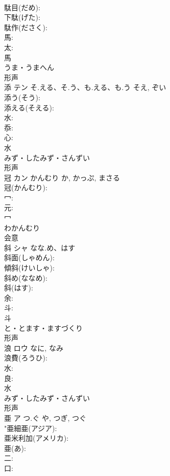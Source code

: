 \documentclass[8pt]{extreport}
\begin{document}
\begin{CJK}{UTF8}{min}
\\	駄目(だめ): 
\\	下駄(げた): 
\\	駄作(ださく): 
\\	馬: 
\\	太: 
\\	馬	
\\	うま・うまへん	
\\	形声 
\\	添	テン	そ.える、そ.う、も.える、も.う	そえ, ぞい	
\\	添う(そう): 
\\	添える(そえる): 
\\	水: 
\\	忝: 
\\	心: 
\\	水	
\\	みず・したみず・さんずい	
\\	形声 
\\	冠	カン	かんむり	か, かっぷ, まさる	
\\	冠(かんむり): 
\\	冖: 
\\	元: 
\\	冖	
\\	わかんむり	
\\	会意 
\\	斜	シャ	なな.め、はす		
\\	斜面(しゃめん): 
\\	傾斜(けいしゃ): 
\\	斜め(ななめ): 
\\	斜(はす): 
\\	余: 
\\	斗: 
\\	斗	
\\	と・とます・ますづくり	
\\	形声 
\\	浪	ロウ		なに, なみ	
\\	浪費(ろうひ): 
\\	水: 
\\	良: 
\\	水	
\\	みず・したみず・さんずい	
\\	形声 
\\	亜	ア	つ.ぐ	や, つぎ, つぐ	
\\	"亜細亜(アジア): 
\\	亜米利加(アメリカ): 
\\	亜(あ): 
\\	二: 
\\	口: 

\end{CJK}
\end{document}
